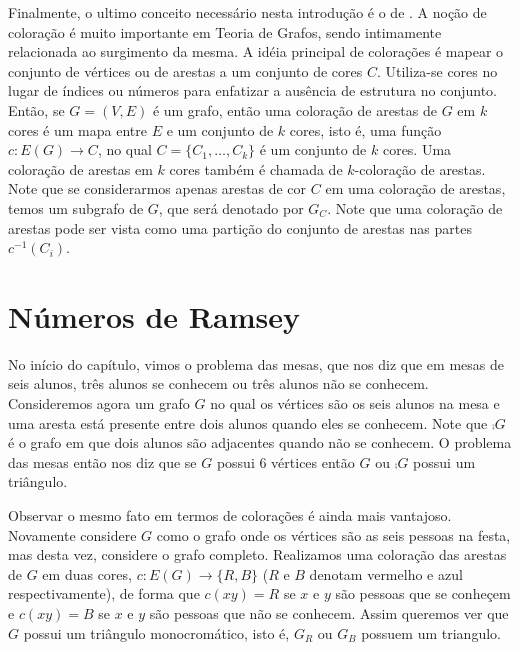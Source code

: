 Finalmente, o ultimo conceito necessário nesta introdução é o de . A noção de coloração é muito importante em Teoria de Grafos, sendo intimamente relacionada ao surgimento da mesma. A idéia principal de colorações é mapear o conjunto de vértices ou de arestas a um conjunto de cores $C$. Utiliza-se cores no lugar de índices ou números para enfatizar a ausência de estrutura no conjunto. Então, se $G = (V,E)$ é um grafo, então uma coloração de arestas de $G$ em $k$ cores é um mapa entre $E$ e um conjunto de $k$ cores, isto é, uma função $c: E(G) \to C$, no qual $C = \{ C_1, \dots, C_k\}$ é um conjunto de $k$ cores. Uma coloração de arestas em $k$ cores também é chamada de $k$-coloração de arestas. Note que se considerarmos apenas arestas de cor $C$ em uma coloração de arestas, temos um subgrafo de $G$, que será denotado por $G_C$. Note que uma coloração de arestas pode ser vista como uma partição do conjunto de arestas nas partes $c^{-1}(C_i)$.



\section{Números de Ramsey}

No início do capítulo, vimos o problema das mesas, que nos diz que em mesas de seis alunos, três alunos se conhecem ou três alunos não se conhecem. Consideremos agora um grafo $G$ no qual os vértices são os seis alunos na mesa e uma aresta está presente entre dois alunos quando eles se conhecem. Note que $\comp{G}$ é o grafo em que dois alunos são adjacentes quando não se conhecem. O problema das mesas então nos diz que se $G$ possui 6 vértices então $G$ ou $\comp{G}$ possui um triângulo.

Observar o mesmo fato em termos de colorações é ainda mais vantajoso. Novamente considere $G$ como o grafo onde os vértices são as seis pessoas na festa, mas desta vez, considere o grafo completo. Realizamos uma coloração das arestas de $G$ em duas cores, $c: E(G) \to \{ R,B \}$ ($R$ e $B$ denotam vermelho e azul respectivamente), de forma que $c(xy) = R$ se $x$ e $y$ são pessoas que se conheçem e $c(xy) = B$ se $x$ e $y$ são pessoas que não se conhecem. Assim queremos ver que $G$ possui um triângulo monocromático, isto é, $G_R$ ou $G_B$ possuem um triangulo.


